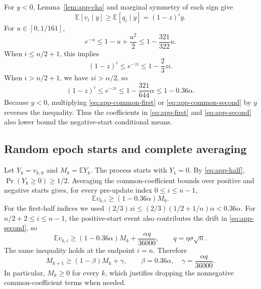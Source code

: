 \documentclass[twoside]{article}
\newcommand{\E}{\mathbb E}
\begin{document}
For $y<0$, Lemma~\ref{lem:app-cha} and marginal symmetry of each sign give
\begin{equation}
 \E[v_i\mid y]\ge\E[q_i\mid y]=(1-z)^iy.
 \label{eq:app-negative}
\end{equation}
For $u\in[0,1/161]$,
\begin{equation}
 e^{-u}\le1-u+\frac{u^2}{2}
 \le1-\frac{321}{322}u.                              \label{eq:app-exp}
\end{equation}
When $i\le n/2+1$, this implies
\begin{equation}
 (1-z)^i\le e^{-zi}\le1-\frac23zi.                  \label{eq:app-common-first}
\end{equation}
When $i>n/2+1$, we have $zi>\alpha/2$, so
\begin{equation}
 (1-z)^i\le e^{-zi}
 \le1-\frac{321}{644}\alpha
 \le1-0.36\alpha.                                   \label{eq:app-common-second}
\end{equation}
Because $y<0$, multiplying
\eqref{eq:app-common-first} or \eqref{eq:app-common-second} by $y$ reverses
the inequality. Thus the coefficients in \eqref{eq:app-first} and
\eqref{eq:app-second} also lower bound the negative-start conditional means.

\subsection{Random epoch starts and complete averaging}

Let $Y_k=v_{k,0}$ and $M_k=\E Y_k$. The process starts with $Y_1=0$.
By \eqref{eq:app-half}, $\Pr(Y_k\ge0)\ge1/2$. Averaging the common-coefficient
bounds over positive and negative starts gives, for every pre-update index
$0\le i\le n-1$,
\begin{equation}
 \E v_{k,i}\ge(1-0.36\alpha)M_k.                    \label{eq:app-all-i}
\end{equation}
For the first-half indices we used
$(2/3)zi\le(2/3)(1/2+1/n)\alpha<0.36\alpha$.
For $n/2+2\le i\le n-1$, the positive-start event also contributes the drift
in \eqref{eq:app-second}, so
\begin{equation}
 \E v_{k,i}\ge(1-0.36\alpha)M_k
 +\frac{\alpha q}{36000},
 \qquad q=\eta\sigma\sqrt n.                        \label{eq:app-drift-i}
\end{equation}
The same inequality holds at the endpoint $i=n$. Therefore
\begin{equation}
 M_{k+1}\ge(1-\beta)M_k+\gamma,
 \qquad \beta=0.36\alpha,
 \quad\gamma=\frac{\alpha q}{36000}.                \label{eq:app-recursion}
\end{equation}
In particular, $M_k\ge0$ for every $k$, which justifies dropping the
nonnegative common-coefficient terms when needed.
\end{document}
